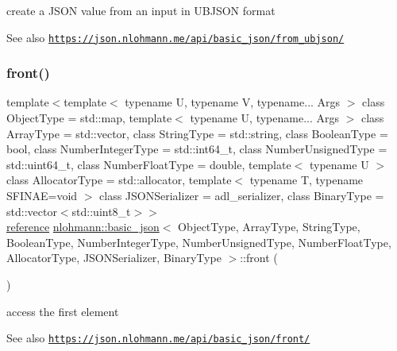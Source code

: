 create a J\+S\+ON value from an input in U\+B\+J\+S\+ON format 

\begin{DoxySeeAlso}{See also}
\href{https://json.nlohmann.me/api/basic_json/from_ubjson/}{\tt https\+://json.\+nlohmann.\+me/api/basic\+\_\+json/from\+\_\+ubjson/} 
\end{DoxySeeAlso}
\mbox{\label{classnlohmann_1_1basic__json_a5417ca43ae5e7a3a2f82eee2d915c6ed}} 
\subsubsection{\texorpdfstring{front()}{front()}\hspace{0.1cm}{\footnotesize\ttfamily [1/2]}}
{\footnotesize\ttfamily template$<$template$<$ typename U, typename V, typename... Args $>$ class Object\+Type = std\+::map, template$<$ typename U, typename... Args $>$ class Array\+Type = std\+::vector, class String\+Type  = std\+::string, class Boolean\+Type  = bool, class Number\+Integer\+Type  = std\+::int64\+\_\+t, class Number\+Unsigned\+Type  = std\+::uint64\+\_\+t, class Number\+Float\+Type  = double, template$<$ typename U $>$ class Allocator\+Type = std\+::allocator, template$<$ typename T, typename S\+F\+I\+N\+A\+E=void $>$ class J\+S\+O\+N\+Serializer = adl\+\_\+serializer, class Binary\+Type  = std\+::vector$<$std\+::uint8\+\_\+t$>$$>$ \\
\hyperlink{classnlohmann_1_1basic__json_a220ae98554a76205fb7f8822d36b2d5a}{reference} \hyperlink{classnlohmann_1_1basic__json}{nlohmann\+::basic\+\_\+json}$<$ Object\+Type, Array\+Type, String\+Type, Boolean\+Type, Number\+Integer\+Type, Number\+Unsigned\+Type, Number\+Float\+Type, Allocator\+Type, J\+S\+O\+N\+Serializer, Binary\+Type $>$\+::front (\begin{DoxyParamCaption}{ }\end{DoxyParamCaption})\hspace{0.3cm}{\ttfamily [inline]}}



access the first element 

\begin{DoxySeeAlso}{See also}
\href{https://json.nlohmann.me/api/basic_json/front/}{\tt https\+://json.\+nlohmann.\+me/api/basic\+\_\+json/front/} 
\end{DoxySeeAlso}
\mbox{\label{classnlohmann_1_1basic__json_a5ac8f974c178cf9326b6765e22f50eb6}} 
